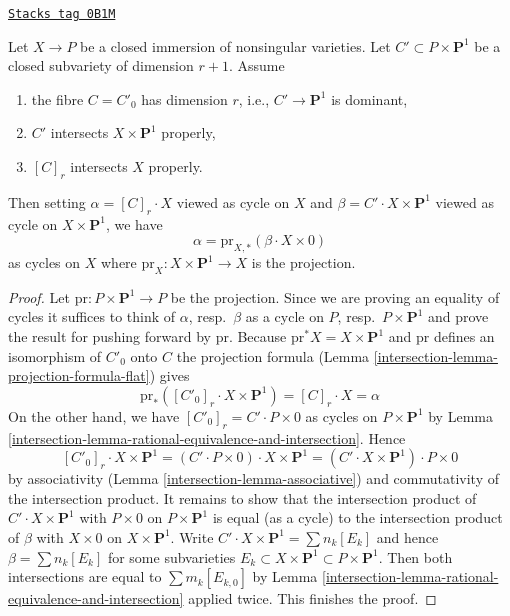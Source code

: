 \begin{lemma}[Transfer]
\label{intersection-lemma-transfer}
\href{https://stacks.math.columbia.edu/tag/0B1M}{\texttt{Stacks tag 0B1M}}

Let $X \to P$ be a closed immersion of nonsingular varieties.
Let $C' \subset P \times \mathbf{P}^1$ be a closed subvariety of dimension
$r + 1$. Assume
\begin{enumerate}
\item the fibre $C = C'_0$ has dimension $r$, i.e., $C' \to \mathbf{P}^1$
is dominant,
\item $C'$ intersects $X \times \mathbf{P}^1$ properly,
\item $[C]_r$ intersects $X$ properly.
\end{enumerate}
Then setting $\alpha = [C]_r \cdot X$ viewed as cycle on $X$ and
$\beta = C' \cdot X \times \mathbf{P}^1$ viewed as cycle on
$X \times \mathbf{P}^1$, we have
$$
\alpha = \text{pr}_{X, *}(\beta \cdot X \times 0)
$$
as cycles on $X$ where $\text{pr}_X : X \times \mathbf{P}^1 \to X$ is the
projection.
\end{lemma}

\begin{proof}

Let $\text{pr} : P \times \mathbf{P}^1 \to P$ be the projection.
Since we are proving an equality of cycles it suffices to think of
$\alpha$, resp.\ $\beta$ as a cycle on $P$, resp.\ $P \times \mathbf{P}^1$
and prove the result for pushing forward by $\text{pr}$.
Because $\text{pr}^*X = X \times \mathbf{P}^1$ and
$\text{pr}$ defines an isomorphism of $C'_0$ onto $C$
the projection formula (Lemma \ref{intersection-lemma-projection-formula-flat})
gives
$$
\text{pr}_*([C'_0]_r \cdot X \times \mathbf{P}^1) = [C]_r \cdot X = \alpha
$$
On the other hand, we have $[C'_0]_r = C' \cdot P \times 0$
as cycles on $P \times \mathbf{P}^1$
by Lemma \ref{intersection-lemma-rational-equivalence-and-intersection}.
Hence
$$
[C'_0]_r \cdot X \times \mathbf{P}^1 =
(C' \cdot P \times 0) \cdot X \times \mathbf{P}^1 =
(C' \cdot X \times \mathbf{P}^1) \cdot P \times 0
$$
by associativity (Lemma \ref{intersection-lemma-associative}) and commutativity of the
intersection product. It remains to show that the intersection product of
$C' \cdot X \times \mathbf{P}^1$ with $P \times 0$ on
$P \times \mathbf{P}^1$ is equal (as a cycle) to the intersection product of
$\beta$ with $X \times 0$ on $X \times \mathbf{P}^1$. Write
$C' \cdot X \times \mathbf{P}^1 = \sum n_k[E_k]$ and hence
$\beta = \sum n_k[E_k]$ for some subvarieties
$E_k \subset X \times \mathbf{P}^1 \subset P \times \mathbf{P}^1$.
Then both intersections are equal to $\sum m_k[E_{k, 0}]$ by
Lemma \ref{intersection-lemma-rational-equivalence-and-intersection} applied twice.
This finishes the proof.
\end{proof}

